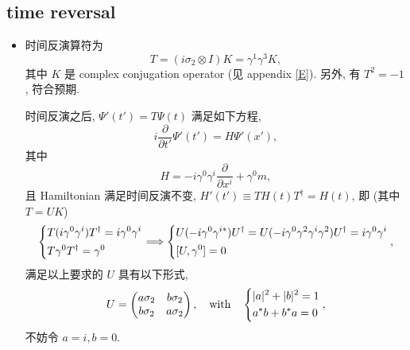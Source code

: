 \subsection{time reversal}
\begin{itemize}
	\item 时间反演算符为
	\begin{equation}
		T = (i \sigma_2 \otimes I) K = \gamma^1 \gamma^3 K,
	\end{equation}
	其中 $K$ 是 complex conjugation operator (见 appendix \ref{E}). 另外, 有 $T^2 = - 1$, 符合预期.
	
	\begin{tcolorbox}[title=proof:]
		时间反演之后, $\Psi'(t') = T \Psi(t)$ 满足如下方程,
		\begin{equation}
			i \frac{\partial}{\partial t'} \Psi'(t') = H \Psi'(x'),
		\end{equation}
		其中
		\begin{equation}
			H = - i \gamma^0 \gamma^i \frac{\partial}{\partial x^i} + \gamma^0 m,
		\end{equation}
		且 Hamiltonian 满足时间反演不变, $H'(t') \equiv T H(t) T^\dag = H(t)$, 即 (其中 $T = U K$)
		\begin{equation}
			\begin{dcases}
				T (i \gamma^0 \gamma^i) T^\dag = i \gamma^0 \gamma^i \\
				T \gamma^0 T^\dag = \gamma^0
			\end{dcases} \Longrightarrow \begin{dcases}
				U (- i \gamma^0 \gamma^{i *}) U^\dag = U (- i \gamma^0 \gamma^2 \gamma^i \gamma^2) U^\dag = i \gamma^0 \gamma^i \\
				[U, \gamma^0] = 0
			\end{dcases},
		\end{equation}
		满足以上要求的 $U$ 具有以下形式,
		\begin{equation}
			U = \begin{pmatrix}
				a \sigma_2 & b \sigma_2 \\
				b \sigma_2 & a \sigma_2
			\end{pmatrix}, \quad \text{with} \quad \begin{dcases}
				|a|^2 + |b|^2 = 1 \\
				a^* b + b^* a = 0
			\end{dcases},
		\end{equation}
		不妨令 $a = i, b = 0$.
	\end{tcolorbox}
\end{itemize}

